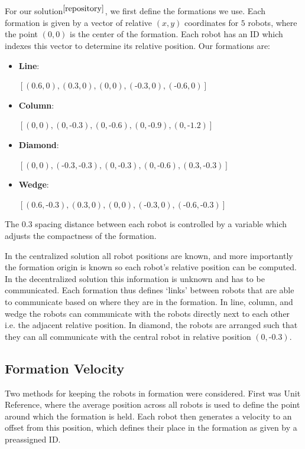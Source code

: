 \documentclass[letterpaper, 10 pt, conference]{ieeeconf}  %
\begin{document}
For our solution$^{\cite{repository}}$, we first define the formations we use. Each formation is given by a vector of relative $(x,y)$ coordinates for $5$ robots, where the point $(0,0)$ is the center of the formation. Each robot has an ID which indexes this vector to determine its relative position. Our formations are:

\begin{itemize}
\item \textbf{Line}:

$[(0.6,0), (0.3,0), (0,0), (\text{-}0.3,0), (\text{-}0.6,0)]$

\item \textbf{Column}:

$[(0,0), (0,\text{-}0.3), (0,\text{-}0.6), (0,\text{-}0.9), (0,\text{-}1.2)]$

\item \textbf{Diamond}:

$[(0,0), (\text{-}0.3,\text{-}0.3), (0,\text{-}0.3), (0,\text{-}0.6), (0.3,\text{-}0.3)]$

\item \textbf{Wedge}:

$[(0.6,\text{-}0.3), (0.3,0), (0,0), (\text{-}0.3,0), (\text{-}0.6,\text{-}0.3)]$
\end{itemize}

The $0.3$ spacing distance between each robot is controlled by a variable which adjusts the compactness of the formation.

In the centralized solution all robot positions are known, and more importantly the formation origin is known so each robot's relative position can be computed. In the decentralized solution this information is unknown and has to be communicated. Each formation thus defines `links' between robots that are able to communicate based on where they are in the formation. In line, column, and wedge the robots can communicate with the robots directly next to each other i.e. the adjacent relative position. In diamond, the robots are arranged such that they can all communicate with the central robot in relative position $(0,\text{-}0.3)$.

\subsection{Formation Velocity}

Two methods for keeping the robots in formation were considered. First was Unit Reference, where the average position across all robots is used to define the point around which the formation is held. Each robot then generates a velocity to an offset from this position, which defines their place in the formation as given by a preassigned ID.
\end{document}
